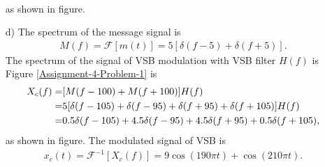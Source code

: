 \documentclass{assignment}
\begin{document}
\begin{sol}
\begin{itemize}
\begin{align}
        \end{align}
        as shown in figure.
        \item[d)] The spectrum of the message signal is
        \begin{align}
            M(f)=\mathscr{F}[m(t)]=5[\delta(f-5)+\delta(f+5)].
        \end{align}
        The spectrum of the signal of VSB modulation with VSB filter $H(f)$ is Figure \ref{Assignment-4-Problem-1} is
        \begin{align}
            \notag X_c(f)=&[M(f-100)+M(f+100)]H(f)\\
            \notag=&5[\delta(f-105)+\delta(f-95)+\delta(f+95)+\delta(f+105)]H(f)\\
            =&0.5\delta(f-105)+4.5\delta(f-95)+4.5\delta(f+95)+0.5\delta(f+105),
        \end{align}
        as shown in figure.
        The modulated signal of VSB is
        \begin{align}
            x_c(t)=\mathscr{F}^{-1}[X_c(f)]=9\cos(190\pi t)+\cos(210\pi t).
        \end{align}
    \end{itemize}
\end{sol}
\end{document}
